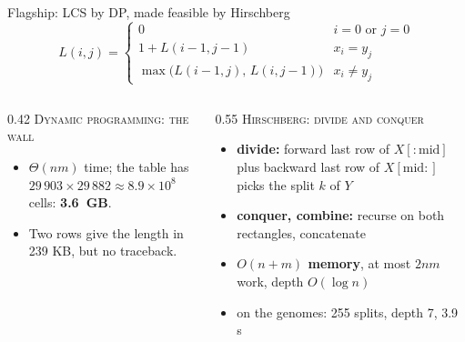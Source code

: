 \documentclass[aspectratio=169,11pt]{beamer}
\newcommand{\lead}[1]{{\color{accent}\scshape #1}}
\newcommand{\hl}[1]{{\color{accent}\bfseries #1}}
\begin{document}
\begin{frame}{Flagship: LCS by DP, made feasible by Hirschberg}
  \vspace{-1.0em}
  \[
    L(i,j) = \begin{cases}
      0 & i = 0 \text{ or } j = 0 \\
      1 + L(i-1,j-1) & x_i = y_j \\
      \max\big(L(i-1,j),\, L(i,j-1)\big) & x_i \ne y_j
    \end{cases}
  \]
  \vspace{-0.5em}
  \begin{columns}[T]
    \begin{column}{0.42\textwidth}
      \small
      \lead{Dynamic programming: the wall}
      \begin{itemize}
        \item $\Theta(nm)$ time; the table has $29\,903 \times 29\,882 \approx 8.9 \times 10^8$ cells: \hl{3.6~GB}.
        \item Two rows give the length in 239 KB, but no traceback.
      \end{itemize}
    \end{column}
    \begin{column}{0.55\textwidth}
      \small
      \lead{Hirschberg: divide and conquer}
      \begin{itemize}
        \item \textbf{divide:} forward last row of $X[{:}\mathrm{mid}]$ plus backward last row of $X[\mathrm{mid}{:}]$ picks the split $k$ of $Y$
        \item \textbf{conquer, combine:} recurse on both rectangles, concatenate
        \item \hl{$O(n + m)$ memory}, at most $2nm$ work, depth $O(\log n)$
        \item on the genomes: 255 splits, depth 7, 3.9 s
      \end{itemize}
    \end{column}
  \end{columns}
\end{frame}
\end{document}
